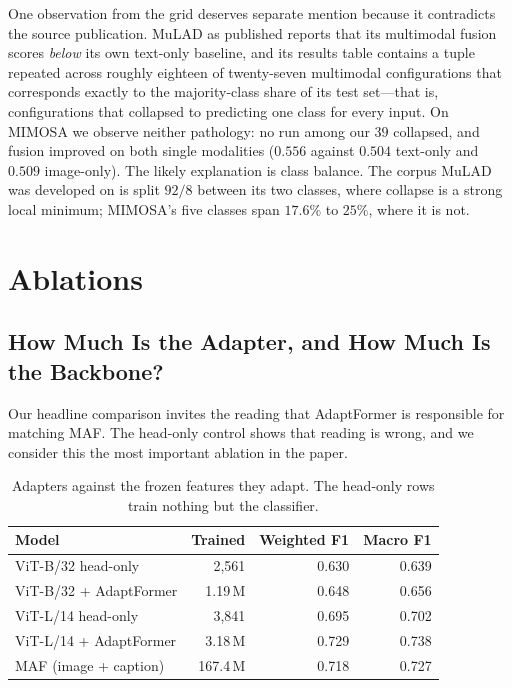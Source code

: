 \documentclass[conference]{IEEEtran}
\begin{document}
One observation from the grid deserves separate mention because it contradicts
the source publication. MuLAD as published reports that its multimodal fusion
scores \emph{below} its own text-only baseline, and its results table contains a
tuple repeated across roughly eighteen of twenty-seven multimodal
configurations that corresponds exactly to the majority-class share of its test
set---that is, configurations that collapsed to predicting one class for every
input. On MIMOSA we observe neither pathology: no run among our $39$ collapsed,
and fusion improved on both single modalities ($0.556$ against $0.504$ text-only
and $0.509$ image-only). The likely explanation is class balance. The corpus
MuLAD was developed on is split $92/8$ between its two classes, where collapse
is a strong local minimum; MIMOSA's five classes span $17.6\%$ to $25\%$, where
it is not.

\section{Ablations}
\label{sec:ablations}

\subsection{How Much Is the Adapter, and How Much Is the Backbone?}
\label{sec:abl-backbone}

Our headline comparison invites the reading that AdaptFormer is responsible for
matching MAF. The head-only control shows that reading is wrong, and we consider
this the most important ablation in the paper.

\begin{table}[t]
\caption{Adapters against the frozen features they adapt. The head-only rows
train nothing but the classifier.}
\label{tab:abl-backbone}
\centering
\footnotesize
\begin{tabular}{lrrr}
\toprule
Model & Trained & Weighted F1 & Macro F1 \\
\midrule
ViT-B/32 head-only          & 2{,}561   & 0.630 & 0.639 \\
ViT-B/32 + AdaptFormer      & 1.19\,M   & 0.648 & 0.656 \\
\midrule
ViT-L/14 head-only          & 3{,}841   & 0.695 & 0.702 \\
ViT-L/14 + AdaptFormer      & 3.18\,M   & 0.729 & 0.738 \\
\midrule
MAF (image + caption)       & 167.4\,M  & 0.718 & 0.727 \\
\bottomrule
\end{tabular}
\end{table}
\end{document}
